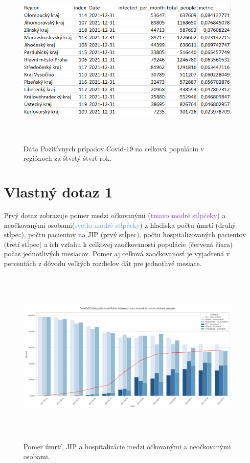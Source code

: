 \documentclass[a4paper, 16pt]{article}
\begin{document}
\begin{figure}[H] \centering
    \includegraphics[width=\linewidth,height=3.5in]{B_3.png}
    \caption{Dáta Pozitívnych prípadov Covid-19 na celkovú populáciu v regiónoch za štvrtý štvrť rok.}
    \label{table_3}
\end{figure}



\section{Vlastný dotaz 1}

Prvý dotaz zobrazuje pomer medzi očkovanými (\textcolor{BlueViolet}{tmavo modré stĺpčeky}) a neočkovanými osobami(\textcolor{CornflowerBlue}{svetlo modré stĺpčeky}) z hľadiska počtu úmrtí (druhý stĺpec), počtu pacientov na JIP (prvý stĺpec), počtu hospitalizovaných pacientov (tretí stĺpec) a ich vzťahu k celkovej zaočkovanosti populácie (červená čiara) počas jednotlivých mesiacov. Pomer aj celková zaočkovanosť je vyjadrená v percentách z dôvodu veľkých rozdielov dát pre jednotlivé mesiace.

\begin{figure}[H] \centering
    \includegraphics[width=\linewidth,height=3.5in]{QC1.png}
    \caption{Pomer úmrtí, JIP a hospitalizácie medzi očkovanými a neočkovanými osobami.}
    \label{graf_4}
\end{figure}
\end{document}
